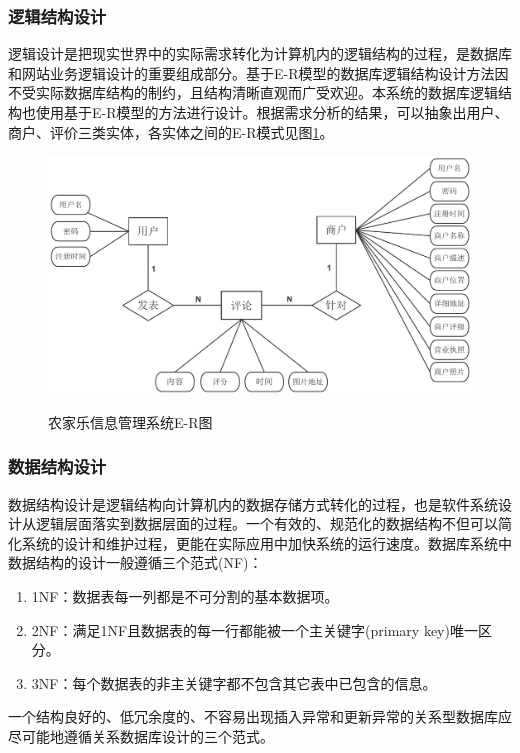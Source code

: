 \documentclass[]{article}
\begin{document}
	\subsubsection{逻辑结构设计}
	逻辑设计是把现实世界中的实际需求转化为计算机内的逻辑结构的过程，是数据库和网站业务逻辑设计的重要组成部分。基于E-R模型的数据库逻辑结构设计方法因不受实际数据库结构的制约，且结构清晰直观而广受欢迎\cite{RN41}。本系统的数据库逻辑结构也使用基于E-R模型的方法进行设计。根据需求分析的结果，可以抽象出用户、商户、评价三类实体，各实体之间的E-R模式见图\ref{ER}。
	\begin{figure}
		\centering
		\includegraphics[width=\textwidth, keepaspectratio]{figures/ER.pdf}\\
		\caption{农家乐信息管理系统E-R图}
		\label{ER}
	\end{figure}
	\subsubsection{数据结构设计}
	数据结构设计是逻辑结构向计算机内的数据存储方式转化的过程，也是软件系统设计从逻辑层面落实到数据层面的过程。一个有效的、规范化的数据结构不但可以简化系统的设计和维护过程，更能在实际应用中加快系统的运行速度\cite{RN42}。数据库系统中数据结构的设计一般遵循三个范式(NF)：\cite{RN43}
	
	\begin{enumerate}
		\item 1NF：数据表每一列都是不可分割的基本数据项。
		\item 2NF：满足1NF且数据表的每一行都能被一个主关键字(primary key)唯一区分。
		\item 3NF：每个数据表的非主关键字都不包含其它表中已包含的信息。
	\end{enumerate}
	
	一个结构良好的、低冗余度的、不容易出现插入异常和更新异常的关系型数据库应尽可能地遵循关系数据库设计的三个范式\cite{RN44}。
	
\end{document}

